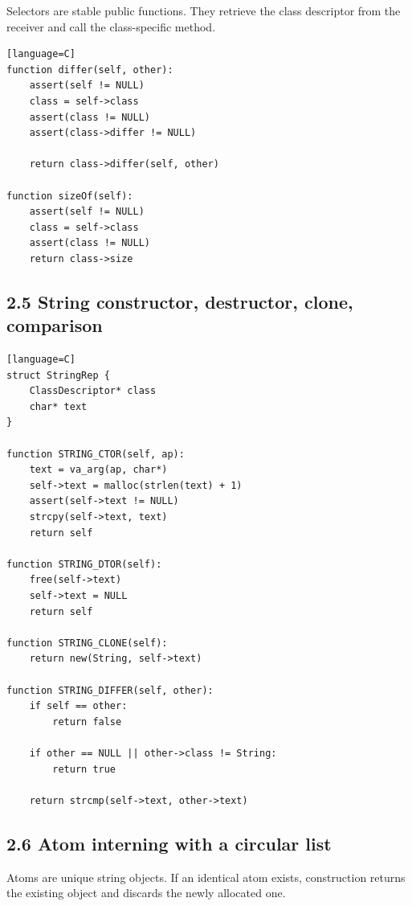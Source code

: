\documentclass[11pt]{article}
\begin{document}
Selectors are stable public functions. They retrieve the class
descriptor from the receiver and call the class-specific method.

\begin{verbatim}[language=C]
function differ(self, other):
    assert(self != NULL)
    class = self->class
    assert(class != NULL)
    assert(class->differ != NULL)

    return class->differ(self, other)

function sizeOf(self):
    assert(self != NULL)
    class = self->class
    assert(class != NULL)
    return class->size
\end{verbatim}

\subsection{2.5 String constructor, destructor, clone,
comparison}\label{string-constructor-destructor-clone-comparison}

\begin{verbatim}[language=C]
struct StringRep {
    ClassDescriptor* class
    char* text
}

function STRING_CTOR(self, ap):
    text = va_arg(ap, char*)
    self->text = malloc(strlen(text) + 1)
    assert(self->text != NULL)
    strcpy(self->text, text)
    return self

function STRING_DTOR(self):
    free(self->text)
    self->text = NULL
    return self

function STRING_CLONE(self):
    return new(String, self->text)

function STRING_DIFFER(self, other):
    if self == other:
        return false

    if other == NULL || other->class != String:
        return true

    return strcmp(self->text, other->text)
\end{verbatim}

\subsection{2.6 Atom interning with a circular
list}\label{atom-interning-with-a-circular-list}

Atoms are unique string objects. If an identical atom exists,
construction returns the existing object and discards the newly
allocated one.
\end{document}
